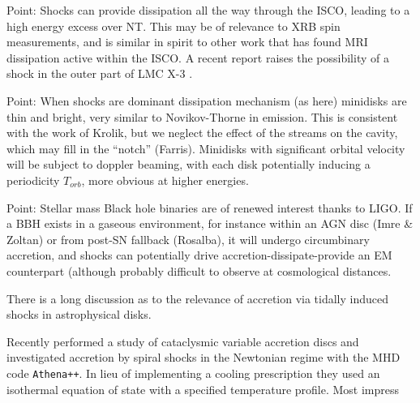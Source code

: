 \documentclass{emulateapj}
\begin{document}
Point: Shocks can provide dissipation all the way through the ISCO, leading to a high energy excess over NT.  This may be of relevance to XRB spin measurements, and is similar in spirit to other work that has found MRI dissipation active within the ISCO.  A recent report raises the possibility of a shock in the outer part of LMC X-3 \citep{Steiner14}.

Point:  When shocks are dominant dissipation mechanism (as here) minidisks are thin and bright, very similar to Novikov-Thorne in emission.  This is consistent with the work of Krolik, but we neglect the effect of the streams on the cavity, which may fill in the ``notch'' (Farris).  Minidisks with significant orbital velocity will be subject to doppler beaming, with each disk potentially inducing a periodicity $T_{orb}$, more obvious at higher energies.

Point:  Stellar mass Black hole binaries are of renewed interest thanks to LIGO.  If a BBH exists in a gaseous environment, for instance within an AGN disc (Imre \& Zoltan) or from post-SN fallback (Rosalba), it will undergo circumbinary accretion, and shocks can potentially drive accretion-dissipate-provide an EM counterpart (although probably difficult to observe at cosmological distances.




































There is a long discussion as to the relevance of accretion via tidally induced shocks in astrophysical disks.  

Recently \cite{Ju16} performed a study of cataclysmic variable accretion discs and investigated accretion by spiral shocks in the Newtonian regime with the MHD code \texttt{Athena++}.  In lieu of implementing a cooling prescription they used an isothermal equation of state with a specified temperature profile.  Most impress
\end{document}
